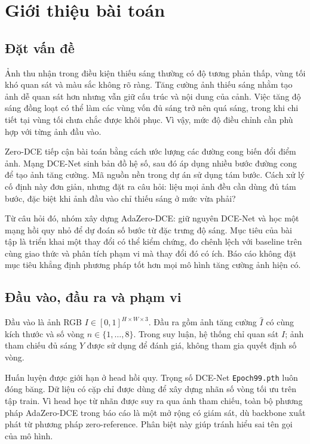 \section{Giới thiệu bài toán}
\subsection{Đặt vấn đề}
Ảnh thu nhận trong điều kiện thiếu sáng thường có độ tương phản thấp, vùng tối khó quan sát và màu sắc không rõ ràng. Tăng cường ảnh thiếu sáng nhằm tạo ảnh dễ quan sát hơn nhưng vẫn giữ cấu trúc và nội dung của cảnh. Việc tăng độ sáng đồng loạt có thể làm các vùng vốn đủ sáng trở nên quá sáng, trong khi chi tiết tại vùng tối chưa chắc được khôi phục. Vì vậy, mức độ điều chỉnh cần phù hợp với từng ảnh đầu vào.

Zero-DCE \cite{zerodce} tiếp cận bài toán bằng cách ước lượng các đường cong biến đổi điểm ảnh. Mạng DCE-Net sinh bản đồ hệ số, sau đó áp dụng nhiều bước đường cong để tạo ảnh tăng cường. Mã nguồn nền trong dự án sử dụng tám bước. Cách xử lý cố định này đơn giản, nhưng đặt ra câu hỏi: liệu mọi ảnh đều cần dùng đủ tám bước, đặc biệt khi ảnh đầu vào chỉ thiếu sáng ở mức vừa phải?

Từ câu hỏi đó, nhóm xây dựng AdaZero-DCE: giữ nguyên DCE-Net và học một mạng hồi quy nhỏ để dự đoán số bước từ đặc trưng độ sáng. Mục tiêu của bài tập là triển khai một thay đổi có thể kiểm chứng, đo chênh lệch với baseline trên cùng giao thức và phân tích phạm vi mà thay đổi đó có ích. Báo cáo không đặt mục tiêu khẳng định phương pháp tốt hơn mọi mô hình tăng cường ảnh hiện có.

\subsection{Đầu vào, đầu ra và phạm vi}
Đầu vào là ảnh RGB $I\in[0,1]^{H\times W\times3}$. Đầu ra gồm ảnh tăng cường $\widehat I$ có cùng kích thước và số vòng $n\in\{1,\ldots,8\}$. Trong suy luận, hệ thống chỉ quan sát $I$; ảnh tham chiếu đủ sáng $Y$ được sử dụng để đánh giá, không tham gia quyết định số vòng.

Huấn luyện được giới hạn ở head hồi quy. Trọng số DCE-Net \texttt{Epoch99.pth} luôn đóng băng. Dữ liệu có cặp chỉ được dùng để xây dựng nhãn số vòng tối ưu trên tập train. Vì head học từ nhãn được suy ra qua ảnh tham chiếu, toàn bộ phương pháp AdaZero-DCE trong báo cáo là một mở rộng có giám sát, dù backbone xuất phát từ phương pháp zero-reference. Phân biệt này giúp tránh hiểu sai tên gọi của mô hình.

